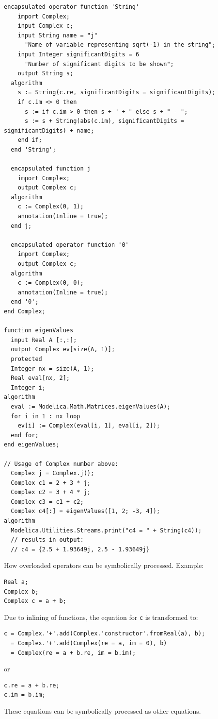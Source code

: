\begin{example}
\begin{lstlisting}[language=modelica,escapechar=!]
  encapsulated operator function 'String'
    import Complex;
    input Complex c;
    input String name = "j"
      "Name of variable representing sqrt(-1) in the string";
    input Integer significantDigits = 6
      "Number of significant digits to be shown";
    output String s;
  algorithm
    s := String(c.re, significantDigits = significantDigits);
    if c.im <> 0 then
      s := if c.im > 0 then s + " + " else s + " - ";
      s := s + String(abs(c.im), significantDigits = significantDigits) + name;
    end if;
  end 'String';

  encapsulated function j
    import Complex;
    output Complex c;
  algorithm
    c := Complex(0, 1);
    annotation(Inline = true);
  end j;

  encapsulated operator function '0'
    import Complex;
    output Complex c;
  algorithm
    c := Complex(0, 0);
    annotation(Inline = true);
  end '0';
end Complex;

function eigenValues
  input Real A [:,:];
  output Complex ev[size(A, 1)];
  protected
  Integer nx = size(A, 1);
  Real eval[nx, 2];
  Integer i;
algorithm
  eval := Modelica.Math.Matrices.eigenValues(A);
  for i in 1 : nx loop
    ev[i] := Complex(eval[i, 1], eval[i, 2]);
  end for;
end eigenValues;

// Usage of Complex number above:
  Complex j = Complex.j();
  Complex c1 = 2 + 3 * j;
  Complex c2 = 3 + 4 * j;
  Complex c3 = c1 + c2;
  Complex c4[:] = eigenValues([1, 2; -3, 4]);
algorithm
  Modelica.Utilities.Streams.print("c4 = " + String(c4));
  // results in output:
  // c4 = {2.5 + 1.93649j, 2.5 - 1.93649j}
\end{lstlisting}

How overloaded operators can be symbolically processed.
Example:
\begin{lstlisting}[language=modelica]
Real a;
Complex b;
Complex c = a + b;
\end{lstlisting}
Due to inlining of functions, the equation for \lstinline!c! is transformed to:
\begin{lstlisting}[language=modelica]
c = Complex.'+'.add(Complex.'constructor'.fromReal(a), b);
  = Complex.'+'.add(Complex(re = a, im = 0), b)
  = Complex(re = a + b.re, im = b.im);
\end{lstlisting}
or
\begin{lstlisting}[language=modelica]
c.re = a + b.re;
c.im = b.im;
\end{lstlisting}
These equations can be symbolically processed as other equations.


\end{example}
